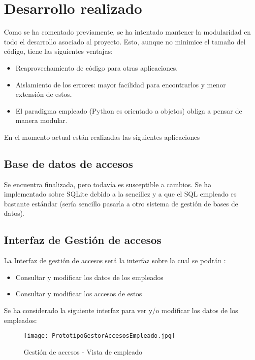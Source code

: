 \chapter{Desarrollo realizado}

Como se ha comentado previamente, se ha intentado mantener la modularidad en todo el desarrollo asociado al proyecto. Esto, aunque no minimice el tamaño del código, tiene las siguientes ventajas:

\begin{itemize}
	\item{Reaprovechamiento de código para otras aplicaciones.}
	\item{Aislamiento de los errores: mayor facilidad para encontrarlos y menor extensión de estos.}
	\item{El paradigma empleado (Python es orientado a objetos) obliga a pensar de manera modular.}
\end{itemize}

En el momento actual están realizadas las siguientes aplicaciones

\section{Base de datos de accesos}
Se encuentra finalizada, pero todavía es susceptible a cambios. Se ha implementado sobre SQLite debido a la sencillez y a que el SQL empleado es bastante estándar (sería sencillo pasarla a otro sistema de gestión de bases de datos).

\section{Interfaz de Gestión de accesos}
La Interfaz de gestión de accesos será la interfaz sobre la cual se podrán :

\begin{itemize}
	\item{Consultar y modificar los datos de los empleados}
	\item{Consultar y modificar los accesos de estos}
\end{itemize}

Se ha considerado la siguiente interfaz para ver y/o modificar los datos de los empleados:
\begin{figure}[h!]
        \centering
        \texttt{[image: PrototipoGestorAccesosEmpleado.jpg]}
        \caption{Gestión de accesos - Vista de empleado}
	\label{fig:gestion_accesos_emp}
\end{figure}

